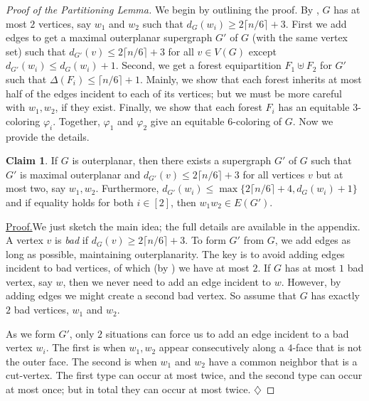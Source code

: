\documentclass[11pt]{article}
\theoremstyle{definition}
\newtheorem{clm}{Claim}
\newcommand\ceil[1]{\lceil#1\rceil}
\renewcommand\ge\geqslant
\renewcommand\le\leqslant
\newcommand\vph\varphi
\newenvironment{clmproof}[1]{\par\noindent\underline{Proof.}\space#1}{\leavevmode\unskip\penalty9999\hbox{}\nobreak\hfill\quad\hbox{$\diamondsuit$}\smallskip}
\begin{document}
\begin{proof}[Proof of the Partitioning Lemma]
	We begin by outlining the proof.  By , $G$ has at most $2$ vertices, say $w_1$ and $w_2$ such that 
	$d_G(w_i)\ge 2\ceil{n/6}+3$.  First we add edges to get a maximal outerplanar supergraph $G'$ of $G$ (with the same vertex set)
	such that $d_{G'}(v)\le 2\ceil{n/6}+3$ for all $v\in V(G)$ except $d_{G'}(w_i)\le d_G(w_i)+1$.
	Second, we get a forest equipartition $F_1\uplus F_2$ for $G'$ such that $\Delta(F_i)\le \ceil{n/6}+1$.
	Mainly, we show that each forest inherits at most half of the edges incident to each of its vertices; but we must be more careful with
	$w_1,w_2$, if they exist.  Finally, we show that each forest $F_i$ has an equitable $3$-coloring $\vph_i$.  Together, $\vph_1$
	and $\vph_2$ give an equitable $6$-coloring of $G$.  Now we provide the details.  

\begin{clm}
	If $G$ is outerplanar, then there exists a supergraph $G'$ of $G$ such that $G'$ is maximal outerplanar and $d_{G'}(v)\le 2\lceil n/6\rceil+3$ 
	for all vertices $v$ but at most two, say $w_1,w_2$.  Furthermore, $d_{G'}(w_i)\le \max\{2\ceil{n/6}+4,d_G(w_i)+1\}$ and if 
    	equality holds for both $i\in [2]$, then $w_1w_2\in E(G')$.
	\label{clm1}
\end{clm}
\begin{clmproof}[Proof Sketch]
	We just sketch the main idea; the full details are available in the appendix.  A vertex $v$ is \emph{bad} if $d_G(v)\ge 2\ceil{n/6}+3$.
	To form $G'$ from $G$, we add edges as long as possible, maintaining outerplanarity.
	The key is to avoid adding edges incident to bad vertices, of which (by ) we have at most $2$.
	If $G$ has at most $1$ bad vertex, say $w$, then we never need to add an edge incident to $w$.  However, by adding edges we might create
	a second bad vertex.  So assume that $G$ has exactly $2$ bad vertices, $w_1$ and $w_2$.  

	As we form $G'$, only $2$ situations can force us to add an edge incident to a bad vertex $w_i$.  The first is when $w_1,w_2$ appear
	consecutively along a $4$-face that is not the outer face.  The second is when $w_1$ and $w_2$ have a common neighbor that is a cut-vertex.
	The first type can occur at most twice, and the second type can occur at most once; but in total they can occur at most twice.
\end{clmproof}



\end{proof}
\end{document}
